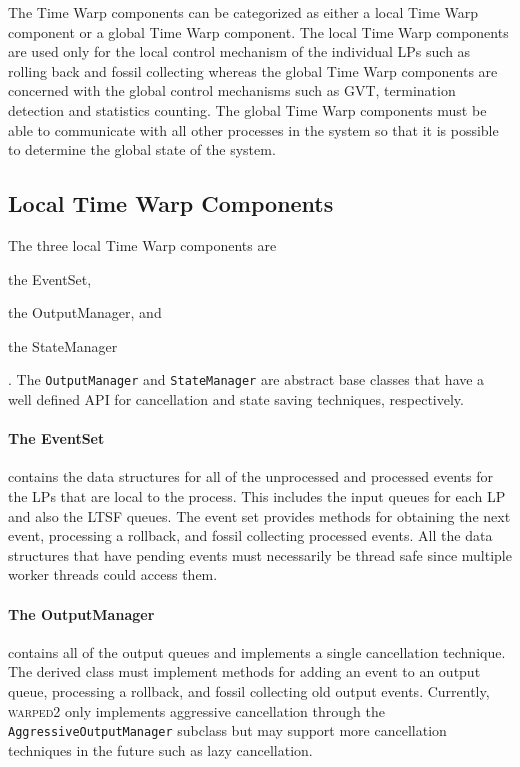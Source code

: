 \documentclass[11pt]{book}
\begin{document}
The Time Warp components can be categorized as either a local Time Warp component or a global
Time Warp component.  The local Time Warp components are used only for the local control
mechanism of the individual LPs such as rolling back and fossil collecting whereas
the global Time Warp components are concerned with the global control mechanisms such as GVT,
termination detection and statistics counting.  The global Time Warp components must be able to
communicate with all other processes in the system so that it is possible to determine the
global state of the system.

\subsection{Local Time Warp Components}

The three local Time Warp components are \begin{inparaenum}[(1)] \item the EventSet,
\item the OutputManager, and \item the StateManager\end{inparaenum}.  The \texttt{OutputManager} and
\texttt{StateManager} are abstract base classes that have a well defined API for cancellation
and state saving techniques, respectively.  

\paragraph{The EventSet} contains the data structures for all of the unprocessed and
processed events for the LPs that are local to the process.  This includes the input queues for
each LP and also the LTSF queues.  The event set provides methods for obtaining the next event,
processing a rollback, and fossil collecting processed events.  All the data structures that have
pending events must necessarily be thread safe since multiple worker threads could access them.

\paragraph{The OutputManager} contains all of the output queues and implements a single
cancellation technique.  The derived class must implement methods for adding an event to an output queue,
processing a rollback, and fossil collecting old output events.  Currently, \textsc{warped2} only
implements aggressive cancellation through the \texttt{AggressiveOutputManager} subclass but
may support more cancellation techniques in the future such as lazy cancellation.
\end{document}
